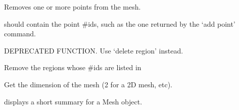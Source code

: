 \documentclass[a4paper,11pt,english]{sphinxmanual}
\begin{document}
\begin{fulllineitems}
\begin{fulllineitems}
\end{fulllineitems}


\begin{fulllineitems}
\label{\detokenize{python/cmdref_Mesh:getfem.Mesh.del_point}}
Removes one or more points from the mesh.

 should contain the point \#ids, such as the one returned by
the ‘add point’ command.

\end{fulllineitems}


\begin{fulllineitems}
\label{\detokenize{python/cmdref_Mesh:getfem.Mesh.delete_boundary}}
DEPRECATED FUNCTION. Use ‘delete region’ instead.

\end{fulllineitems}


\begin{fulllineitems}
\label{\detokenize{python/cmdref_Mesh:getfem.Mesh.delete_region}}
Remove the regions whose \#ids are listed in 

\end{fulllineitems}


\begin{fulllineitems}
\label{\detokenize{python/cmdref_Mesh:getfem.Mesh.dim}}
Get the dimension of the mesh (2 for a 2D mesh, etc).

\end{fulllineitems}


\begin{fulllineitems}
\label{\detokenize{python/cmdref_Mesh:getfem.Mesh.display}}
displays a short summary for a Mesh object.


\end{fulllineitems}
\end{fulllineitems}
\end{document}
